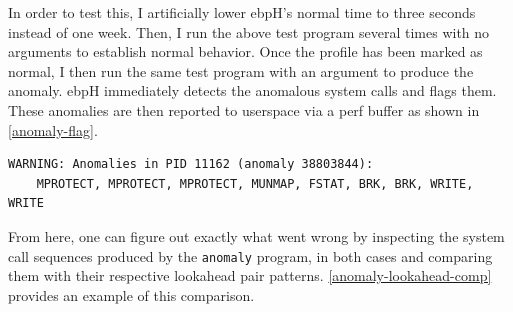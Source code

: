 \documentclass[
  12pt]{findlay}
\newcommand{\passthrough}[1]{#1}
\begin{document}
\protect\enlargethispage*{\baselineskip}


In order to test this, I artificially lower ebpH's normal time to three
seconds instead of one week. Then, I run the above test program several
times with no arguments to establish normal behavior. Once the profile
has been marked as normal, I then run the same test program with an
argument to produce the anomaly. ebpH immediately detects the anomalous
system calls and flags them. These anomalies are then reported to
userspace via a perf buffer as shown in \autoref{anomaly-flag}.

\begin{lstlisting}[label={anomaly-flag}, numbers=none, caption={[The flagged anomaly in the \texttt{anomaly}
binary as shown in the ebpH logs]The flagged anomaly in the \texttt{anomaly}
binary as shown in the ebpH logs. Note that ebpH also logs the offending sequence, reordering it
so that most recent system calls appear on the right.}, language=none]
WARNING: Anomalies in PID 11162 (anomaly 38803844):
    MPROTECT, MPROTECT, MPROTECT, MUNMAP, FSTAT, BRK, BRK, WRITE, WRITE
\end{lstlisting}

From here, one can figure out exactly what went wrong by inspecting the
system call sequences produced by the \passthrough{\lstinline!anomaly!}
program, in both cases and comparing them with their respective
lookahead pair patterns. \autoref{anomaly-lookahead-comp} provides an
example of this comparison.
\end{document}
